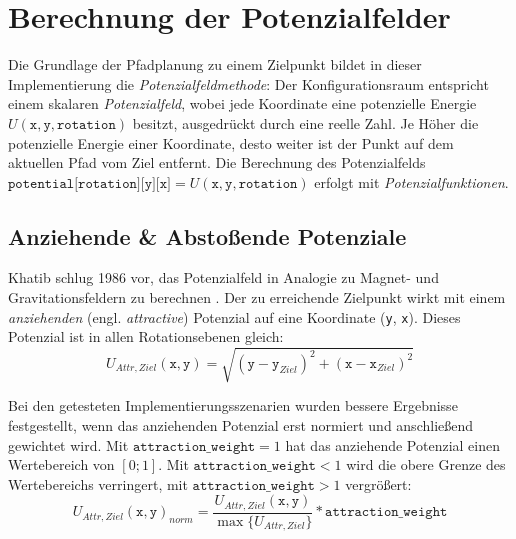 \chapter{Berechnung der Potenzialfelder}

Die Grundlage der Pfadplanung zu einem Zielpunkt bildet in dieser Implementierung die \textit{Potenzialfeldmethode}:
Der Konfigurationsraum entspricht einem skalaren \textit{Potenzialfeld}, wobei jede Koordinate eine potenzielle Energie $U(\texttt{x}, \texttt{y}, \texttt{rotation})$ besitzt, ausgedrückt durch eine reelle Zahl.
Je Höher die potenzielle Energie einer Koordinate, desto weiter ist der Punkt auf dem aktuellen Pfad vom Ziel entfernt.
Die Berechnung des Potenzialfelds $\texttt{potential[rotation][y][x]} = U(\texttt{x}, \texttt{y}, \texttt{rotation})$ erfolgt mit \textit{Potenzialfunktionen}. \cite{yujiang.2017}

\vspace*{0.2cm}
\section{Anziehende \& Abstoßende Potenziale} \label{sec:attr-repul-pot}

Khatib schlug 1986 vor, das Potenzialfeld in Analogie zu Magnet- und Gravitationsfeldern zu berechnen \cite{khatib.1985}. Der zu erreichende Zielpunkt wirkt mit einem \textit{anziehenden} (engl. \textit{attractive}) Potenzial auf eine Koordinate (\texttt{y}, \texttt{x}). Dieses Potenzial ist in allen Rotationsebenen gleich:
\vspace*{0.25cm}
\begin{equation*}
U_{Attr, Ziel}(\texttt{x}, \texttt{y}) = \sqrt{(\texttt{y} - \texttt{y}_{Ziel})^2 + (\texttt{x} - \texttt{x}_{Ziel})^2}
\end{equation*}

Bei den getesteten Implementierungsszenarien wurden bessere Ergebnisse festgestellt, wenn das anziehenden Potenzial erst normiert und anschließend gewichtet wird. Mit $\texttt{attraction\_weight} = 1$ hat das anziehende Potenzial einen Wertebereich von $[0;1]$. Mit  $\texttt{attraction\_weight} < 1$ wird die obere Grenze des Wertebereichs verringert, mit $\texttt{attraction\_weight} > 1$ vergrößert:
\vspace*{0.3cm}
\begin{equation*}
U_{Attr, Ziel}(\texttt{x}, \texttt{y})_{norm} = \frac{U_{Attr, Ziel}(\texttt{x}, \texttt{y})}{\max \{ U_{Attr, Ziel}\}} * \texttt{attraction\_weight} 
\end{equation*}

